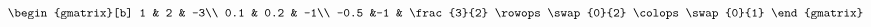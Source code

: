 \documentclass{article}
\begin{document}
\[\begin{gmatrix}[b]
   1   & 2   & -3\\
   0.1 & 0.2 & -1\\
  -0.5 &-1   & \frac{3}{2}
\rowops\swap{0}{2} \colops\swap{0}{1}
\end{gmatrix}\]
\end{document}
